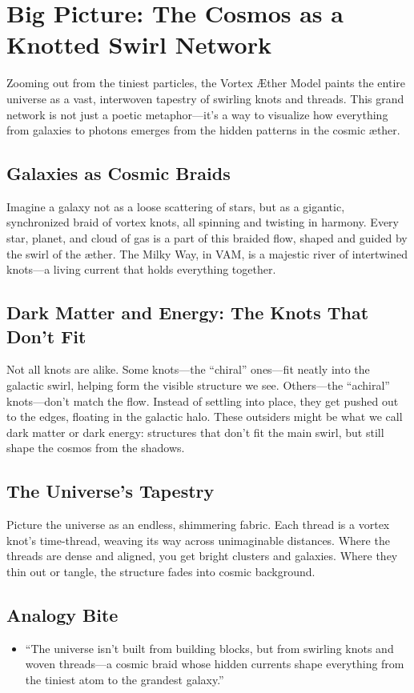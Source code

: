 
\section{Big Picture: The Cosmos as a Knotted Swirl Network}

Zooming out from the tiniest particles, the Vortex Æther Model paints the entire universe as a vast, interwoven tapestry of swirling knots and threads. This grand network is not just a poetic metaphor—it’s a way to visualize how everything from galaxies to photons emerges from the hidden patterns in the cosmic æther.


\subsection*{Galaxies as Cosmic Braids}

Imagine a galaxy not as a loose scattering of stars, but as a gigantic, synchronized braid of vortex knots, all spinning and twisting in harmony. Every star, planet, and cloud of gas is a part of this braided flow, shaped and guided by the swirl of the æther. The Milky Way, in VAM, is a majestic river of intertwined knots—a living current that holds everything together.


\subsection*{Dark Matter and Energy: The Knots That Don’t Fit}

Not all knots are alike. Some knots—the “chiral” ones—fit neatly into the galactic swirl, helping form the visible structure we see. Others—the “achiral” knots—don’t match the flow. Instead of settling into place, they get pushed out to the edges, floating in the galactic halo. These outsiders might be what we call dark matter or dark energy: structures that don’t fit the main swirl, but still shape the cosmos from the shadows.


\subsection*{The Universe’s Tapestry}

Picture the universe as an endless, shimmering fabric. Each thread is a vortex knot’s time-thread, weaving its way across unimaginable distances. Where the threads are dense and aligned, you get bright clusters and galaxies. Where they thin out or tangle, the structure fades into cosmic background.


\subsection*{Analogy Bite}

\begin{itemize}

\item
“The universe isn’t built from building blocks, but from swirling knots and woven threads—a cosmic braid whose hidden currents shape everything from the tiniest atom to the grandest galaxy.”




\end{itemize}